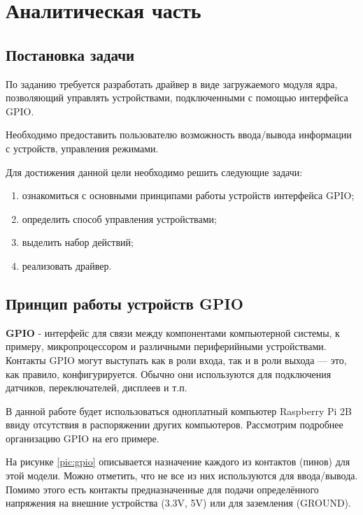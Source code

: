 \section{Аналитическая часть}

\subsection{Постановка задачи}\label{sec:task}
По заданию требуется разработать драйвер в виде загружаемого модуля ядра, позволяющий управлять устройствами, подключенными с помощью интерфейса GPIO.

Необходимо предоставить пользователю возможность ввода/вывода информации с устройств, управления режимами.

Для достижения данной цели необходимо решить следующие задачи:
\begin{enumerate}
	\item ознакомиться с основными принципами работы устройств интерфейса GPIO;
	\item определить способ управления устройствами;
	\item выделить набор действий;
	\item реализовать драйвер.
\end{enumerate}

\subsection{Принцип работы устройств GPIO}
\textbf{GPIO} - интерфейс для связи между компонентами компьютерной системы, к примеру, микропроцессором и различными периферийными устройствами\cite{subj:def}. Контакты GPIO могут выступать как в роли входа, так и в роли выхода — это, как правило, конфигурируется. Обычно они используются для подключения датчиков, переключателей, дисплеев и т.п.

В данной работе будет использоваться одноплатный компьютер Raspberry Pi 2B ввиду отсутствия в распоряжении других компьютеров. Рассмотрим подробнее организацию GPIO на его примере.

На рисунке \ref{pic:gpio} описывается назначение каждого из контактов (пинов)  для этой модели. Можно отметить, что не все из них используются для ввода/вывода. Помимо этого есть контакты предназначенные для подачи определённого напряжения на внешние устройства (3.3V, 5V) или для заземления (GROUND).

